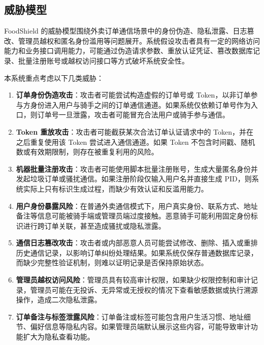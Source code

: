 \subsection{威胁模型}

FoodShield 的威胁模型围绕外卖订单通信场景中的身份伪造、隐私泄露、日志篡改、管理员越权和匿名身份滥用等问题展开。系统假设攻击者具有一定的网络访问能力和业务接口调用能力，可能通过伪造请求参数、重放认证凭证、篡改数据库记录、批量注册账号或越权访问接口等方式破坏系统安全性。

本系统重点考虑以下几类威胁：

\begin{enumerate}[label=\arabic*., leftmargin=2em]
\item \textbf{订单身份伪造攻击}：攻击者可能尝试构造虚假的订单号或 Token，以非订单参与方身份进入用户与骑手之间的订单通信通道。如果系统仅依赖订单号作为入口，则订单号一旦泄露，攻击者可能冒充合法用户或骑手参与通信。

\item \textbf{Token 重放攻击}：攻击者可能截获某次合法订单认证请求中的 Token，并在之后重复使用该 Token 尝试进入通信通道。如果 Token 不包含时间戳、随机数或有效期限制，则存在被重复利用的风险。

\item \textbf{机器批量注册攻击}：攻击者可能使用脚本批量注册账号，生成大量匿名身份并发起垃圾订单或骚扰通信。如果注册阶段仅输入用户名并直接生成 PID，则系统实际上只有标识生成过程，而缺少有效认证和反滥用能力。

\item \textbf{用户身份暴露风险}：在普通外卖通信模式下，用户真实身份、联系方式、地址备注等信息可能被骑手端或管理员端过度接触。恶意骑手可能利用固定身份标识进行跨订单关联，甚至造成骚扰或隐私泄露。

\item \textbf{通信日志篡改攻击}：攻击者或内部恶意人员可能尝试修改、删除、插入或重排历史通信记录，以影响订单纠纷处理结果。如果系统仅保存普通数据库记录，而缺少完整性验证机制，则难以证明记录是否保持原始状态。

\item \textbf{管理员越权访问风险}：管理员具有较高审计权限，如果缺少权限控制和审计记录，管理员可能在无投诉、无异常或无授权的情况下查看敏感数据或执行溯源操作，造成二次隐私泄露。

\item \textbf{订单备注与标签泄露风险}：订单备注或标签可能包含用户生活习惯、地址细节、偏好信息等隐私内容。如果管理员端默认展示这些内容，可能导致审计功能扩大为隐私查看功能。
\end{enumerate}

